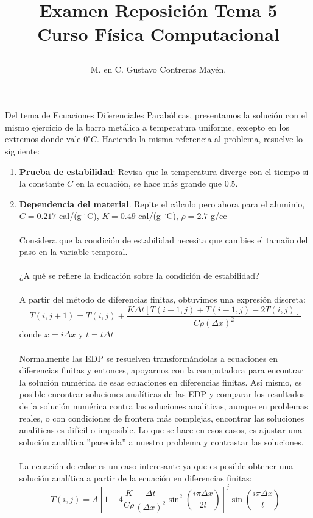 \documentclass[12pt]{article}
\author{M. en C. Gustavo Contreras Mayén.}
\title{\begin{center}
Examen Reposición Tema 5 \\ Curso Física Computacional
\end{center}}
\date{ }
\begin{document}
\maketitle
\fontsize{13}{13}\selectfont
Del tema de Ecuaciones Diferenciales Parabólicas, presentamos la solución con el mismo ejercicio de la barra metálica a temperatura uniforme, excepto en los extremos donde vale $0^{\circ}C$. Haciendo la misma referencia al problema, resuelve lo siguiente:
\begin{enumerate}
\item \textbf{Prueba de estabilidad}: Revisa que la temperatura diverge con el tiempo si la constante $C$ en la ecuación, se hace más grande que $0.5$.
\item \textbf{Dependencia del material}. Repite el cálculo pero ahora para el aluminio, $C=0.217$ cal/(g ${}^{\circ}$C), $K=0.49$ cal/(g ${}^{\circ}$C), $\rho = 2.7$ g/cc 
\\ 
\\
Considera que la condición de estabilidad necesita que cambies el tamaño del paso en la variable temporal.
\\
\\
¿A qué se refiere la indicación sobre la condición de estabilidad?
\\
\\
A partir del método de diferencias finitas, obtuvimos una expresión discreta:
\[ T(i,j+1)=T(i,j) + \dfrac{K \Delta t [T(i+1,j) + T(i-1,j) - 2T(i,j)]}{C \rho (\Delta x)^{2}} \]
donde $x = i \Delta x$ y $ t= t \Delta t$
\\
\\
Normalmente las EDP se resuelven transformándolas a ecuaciones en diferencias finitas y entonces, apoyarnos con la computadora para encontrar la solución numérica de esas ecuaciones en diferencias finitas. Así mismo, es posible encontrar soluciones analíticas de las EDP y comparar los resultados de la solución numérica contra las soluciones analíticas, aunque en problemas reales, o con condiciones de frontera más complejas, encontrar las soluciones analíticas es difícil o imposible. Lo que se hace en esos casos, es ajustar una solución analítica ''parecida'' a nuestro problema y contrastar las soluciones.
\\
\\
La ecuación de calor es un caso interesante ya que es posible obtener una solución analítica a partir de la ecuación en diferencias finitas:
\[  T(i,j) = A \left[  1 - 4 \dfrac{K}{C \rho} \dfrac{\Delta t}{(\Delta x)^{2}}  \sin^{2} \left( \dfrac{i \pi \Delta x}{2l} \right) \right]^{j} \sin \left( \dfrac{i \pi \Delta x}{l} \right) \]

\end{enumerate}
\end{document}
